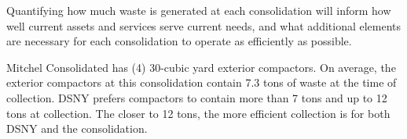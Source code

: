
    Quantifying how much waste is generated at each consolidation will inform how well current assets and services serve current needs, and what additional elements are necessary for each consolidation to operate as efficiently as possible.
    
    Mitchel Consolidated has (4) 30-cubic yard exterior compactors. On average, the exterior compactors at this consolidation contain 7.3 tons of waste at the time of collection. DSNY prefers compactors to contain more than 7 tons and up to 12 tons at collection. The closer to 12 tons, the more efficient collection is for both DSNY and the consolidation.